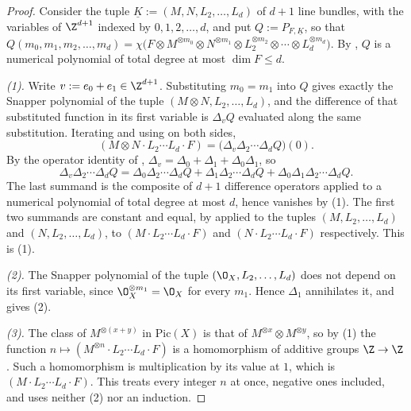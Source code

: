 \begin{proof}
Consider the tuple $\underline K:=(M,N,L_2,\dots,L_d)$ of $d+1$ line bundles,
with the variables of $\Z^{d+1}$ indexed by $0,1,2,\dots,d$, and put
$Q:=P_{F,\underline K}$, so that
$Q(m_0,m_1,m_2,\dots,m_d)=\chi\bigl(F\otimes M^{\otimes m_0}\otimes
N^{\otimes m_1}\otimes L_2^{\otimes m_2}\otimes\cdots\otimes
L_d^{\otimes m_d}\bigr)$.  By , $Q$ is a numerical
polynomial of total degree at most $\dim F\leq d$.

\emph{(1).}  Write $v:=e_0+e_1\in\Z^{d+1}$.  Substituting $m_0=m_1$ into $Q$
gives exactly the Snapper polynomial of the tuple
$(M\otimes N,L_2,\dots,L_d)$, and the difference of that substituted function
in its first variable is $\Delta_v Q$ evaluated along the same substitution.
Iterating and using  on both sides,
\[
  (M\otimes N\cdot L_2\cdots L_d\cdot F)
  =\bigl(\Delta_v\Delta_2\cdots\Delta_dQ\bigr)(0).
\]
By the operator identity of ,
$\Delta_v=\Delta_0+\Delta_1+\Delta_0\Delta_1$, so
\[
  \Delta_v\Delta_2\cdots\Delta_dQ
  =\Delta_0\Delta_2\cdots\Delta_dQ+\Delta_1\Delta_2\cdots\Delta_dQ
  +\Delta_0\Delta_1\Delta_2\cdots\Delta_dQ .
\]
The last summand is the composite of $d+1$ difference operators applied to a
numerical polynomial of total degree at most $d$, hence vanishes by
(1).  The first two summands are
constant and equal, by  applied to
the tuples $(M,L_2,\dots,L_d)$ and $(N,L_2,\dots,L_d)$, to
$(M\cdot L_2\cdots L_d\cdot F)$ and $(N\cdot L_2\cdots L_d\cdot F)$
respectively.  This is (1).

\emph{(2).}  The Snapper polynomial of the tuple $(\O_X,L_2,\dots,L_d)$ does
not depend on its first variable, since $\O_X^{\otimes m_1}=\O_X$ for every
$m_1$.  Hence $\Delta_1$ annihilates it, and
 gives (2).

\emph{(3).}  The class of $M^{\otimes(x+y)}$ in $\mathrm{Pic}(X)$ is that of
$M^{\otimes x}\otimes M^{\otimes y}$, so by (1) the function
$n\mapsto(M^{\otimes n}\cdot L_2\cdots L_d\cdot F)$ is a homomorphism of
additive groups $\Z\to\Z$.  Such a homomorphism is multiplication by its value
at $1$, which is $(M\cdot L_2\cdots L_d\cdot F)$.  This treats every integer
$n$ at once, negative ones included, and uses neither (2) nor an induction.
\end{proof}

